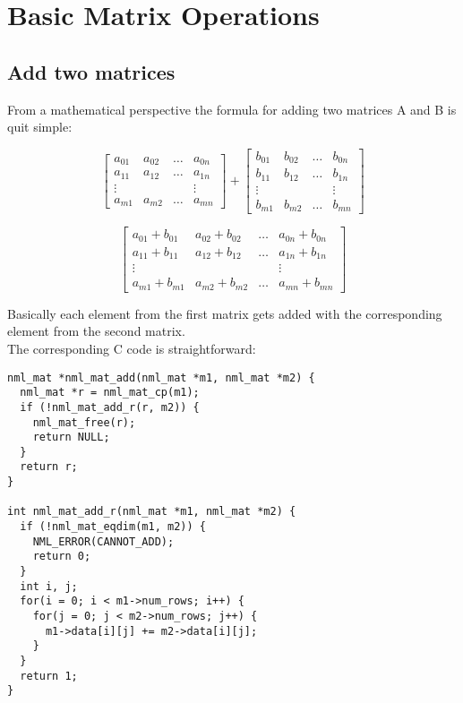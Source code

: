 \section{Basic Matrix Operations}

\subsection{Add two matrices}

From a mathematical perspective the formula for adding two matrices A and B is quit simple:

$$
\left[ \begin{array}{cccc}
a_{01} & a_{02} & \ldots & a_{0n} \\
a_{11} & a_{12} & \ldots & a_{1n} \\
\vdots &&& \vdots \\
a_{m1} & a_{m2} & \ldots & a_{mn}
\end{array} \right]
+
\left[ \begin{array}{cccc}
b_{01} & b_{02} & \ldots & b_{0n} \\
b_{11} & b_{12} & \ldots & b_{1n} \\
\vdots &&& \vdots \\
b_{m1} & b_{m2} & \ldots & b_{mn}
\end{array} \right]
$$

$$
\left[ \begin{array}{cccc}
a_{01}+b_{01} & a_{02}+b_{02} & \ldots & a_{0n}+b_{0n} \\
a_{11}+b_{11} & a_{12}+b_{12} & \ldots & a_{1n}+b_{1n} \\
\vdots &&& \vdots \\
a_{m1}+b_{m1} & a_{m2}+b_{m2} & \ldots & a_{mn}+b_{mn}
\end{array} \right]
$$

Basically each element from the first matrix gets added with the corresponding element from the second matrix.
\\

The corresponding C code is straightforward:

\begin{verbatim}
nml_mat *nml_mat_add(nml_mat *m1, nml_mat *m2) {
  nml_mat *r = nml_mat_cp(m1);
  if (!nml_mat_add_r(r, m2)) {
    nml_mat_free(r);
    return NULL;
  }
  return r;
}

int nml_mat_add_r(nml_mat *m1, nml_mat *m2) {
  if (!nml_mat_eqdim(m1, m2)) {
    NML_ERROR(CANNOT_ADD);
    return 0;
  }
  int i, j;
  for(i = 0; i < m1->num_rows; i++) {
    for(j = 0; j < m2->num_rows; j++) {
      m1->data[i][j] += m2->data[i][j];
    }
  }
  return 1;
}
\end{verbatim}

